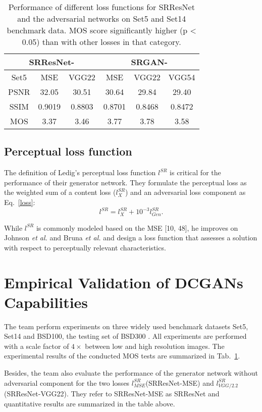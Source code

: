 \documentclass[10pt,twocolumn,letterpaper]{article}
\begin{document}
\begin{table}
	\caption{Performance of different loss functions for SRResNet and the adversarial networks on Set5 and Set14 benchmark data. MOS score significantly higher (p < 0.05) than with other losses in that category.}\label{t1}
	\begin{center}
		\begin{tabular}{|c c c|c c c|}
			\hline
			\multicolumn{3}{|c|}{SRResNet-} & \multicolumn{3}{|c|}{SRGAN-} \\
			\hline
			Set5 & MSE & VGG22 & MSE & VGG22 & VGG54 \\
			
			PSNR & 32.05 & 30.51 & 30.64& 29.84& 29.40 \\
			
			SSIM & 0.9019 & 0.8803 & 0.8701&0.8468& 0.8472 \\
			
			MOS & 3.37 & 3.46 & 3.77& 3.78& 3.58 \\
			\hline
		\end{tabular}
	\end{center}
\end{table}


\subsection{Perceptual loss function}

The definition of Ledig's perceptual loss function $l^{SR}$ is critical for the performance of their generator network. They formulate the perceptual loss as the weighted sum of a content loss ($l_X^{SR}$) and an adversarial loss component as Eq.~\ref{loss}:
\begin{equation}
l^{SR}=l_X^{SR}+10^{-3}l_{Gen}^{SR}.   \label{loss}
\end{equation}

While $l^{SR}$ is commonly modeled based on the MSE [10, 48], he improves on Johnson \emph{et al.} \cite{Johnson2016Perceptual} and Bruna \emph{et al.} \cite{Bruna2015Super} and design a loss function that assesses a solution with respect to perceptually relevant characteristics.

\section{Empirical Validation of DCGANs Capabilities}

The team perform experiments on three widely used benchmark datasets Set5, Set14 and BSD100, the testing set of BSD300 \cite{Martin2002A}. All experiments are performed with a scale factor of $4\times$ between low and high resolution images. The experimental results of the conducted MOS tests are summarized in Tab.~\ref{t1}.

Besides, the team also evaluate the performance of the generator network without adversarial component for the two losses $l_{MSE}^{SR}$(SRResNet-MSE) and $l_{VGG/2.2}^{SR}$ (SRResNet-VGG22). They refer to SRResNet-MSE as SRResNet and quantitative results are summarized in the table above.

{\small


}
\end{document}
